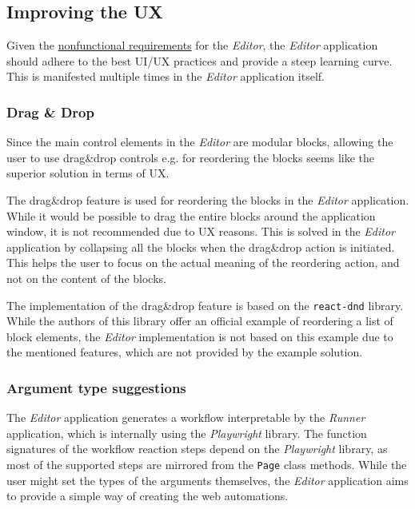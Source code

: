 
\subsection{Improving the \acs{UX}}
Given the \hyperref[requirements]{nonfunctional requirements} for the \textit{Editor}, the \textit{Editor} application should adhere to the best \ac{UI}/\ac{UX} practices and provide a steep learning curve.
This is manifested multiple times in the \textit{Editor} application itself.


\subsubsection{Drag \& Drop}
Since the main control elements in the \textit{Editor} are modular blocks, allowing the user to use drag\&drop controls e.g. for reordering the blocks seems like the superior solution in terms of UX.

The drag\&drop feature is used for reordering the blocks in the \textit{Editor} application.
While it would be possible to drag the entire blocks around the application window, it is not recommended due to UX reasons.
This is solved in the \textit{Editor} application by collapsing all the blocks when the drag\&drop action is initiated.
This helps the user to focus on the actual meaning of the reordering action, and not on the content of the blocks.

The implementation of the drag\&drop feature is based on the \texttt{react-dnd} library.
While the authors of this library offer an official example of reordering a list of block elements, the \textit{Editor} implementation is not based on this example due to the mentioned features,
which are not provided by the example solution.

\subsubsection{Argument type suggestions}
The \textit{Editor} application generates a workflow interpretable by the \textit{Runner} application, which is internally using the \textit{Playwright} library.
The function signatures of the workflow reaction steps depend on the \textit{Playwright} library, as most of the supported steps are mirrored from the \texttt{Page} class methods.
While the user might set the types of the arguments themselves, the \textit{Editor} application aims to provide a simple way of creating the web automations.

